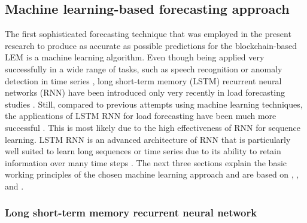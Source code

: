 
\subsection{Machine learning-based forecasting approach} \label{Sec:Method;Subsec:LSTM}

The first sophisticated forecasting technique that was employed in the present research to produce as accurate as possible predictions for the blockchain-based LEM is a machine learning algorithm. Even though being applied very successfully in a wide range of tasks, such as speech recognition \citep{Graves:2013} or anomaly detection in time series \citep{Malhotra:2015}, long short-term memory (LSTM) recurrent neural networks (RNN) have been introduced only very recently in load forecasting studies \citep[e.g.,][]{Kong:2018,Shi:2017,Gan:2017,Chen:2018}. Still, compared to previous attempts using machine learning techniques, the applications of LSTM RNN for load forecasting have been much more successful \citep{Kong:2018,Shi:2017}. This is most likely due to the high effectiveness of RNN for sequence learning. LSTM RNN is an advanced architecture of RNN that is particularly well suited to learn long sequences or time series due to its ability to retain information over many time steps \citep{Chollet:2018}. The next three sections explain the basic working principles of the chosen machine learning approach and are based on \citet{Chollet:2018}, \citet{Lipton:2015}, and \citet{Gan:2017}.



\subsubsection{Long short-term memory recurrent neural network}\label{Sec:Method;Subsec:LSTM:Theory}

